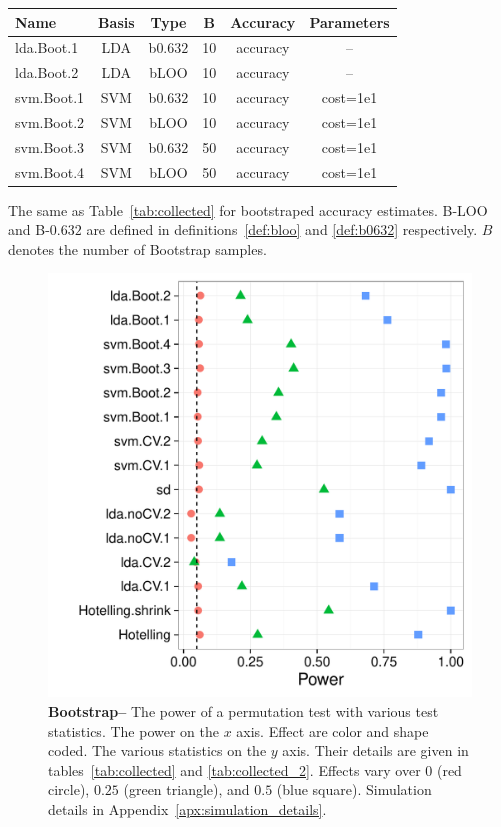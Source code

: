 \documentclass[12pt,a4paper]{article}
\theoremstyle{definition}
\begin{document}
\bigskip

\begin{tcolorbox}
\centering
\begin{tabular}{l|c|c|c|c|c}
Name & Basis & Type & B & Accuracy & Parameters\\ 
\hline
\hline
lda.Boot.1 & LDA & b$0.632$ 	& 10 & accuracy &  -- \\ 
lda.Boot.2 & LDA & bLOO 	& 10 & accuracy &  -- \\ 
svm.Boot.1 & SVM & b$0.632$ 	& 10 & accuracy & cost=1e1 \\ 
svm.Boot.2 & SVM & bLOO 	& 10 & accuracy & cost=1e1 \\ 
svm.Boot.3 & SVM & b$0.632$ 	& 50 & accuracy & cost=1e1 \\ 
svm.Boot.4 & SVM & bLOO 	& 50 & accuracy & cost=1e1 \\ 
\end{tabular} 
\captionsetup{type=table}
\caption{
The same as Table~\ref{tab:collected} for bootstraped accuracy estimates. 
B-LOO and B-$0.632$ are defined in definitions~\ref{def:bloo} and \ref{def:b0632} respectively.
$B$ denotes the number of Bootstrap samples. } %
\label{tab:collected_2}
\end{tcolorbox}


\begin{figure}[ht]
\centering
	  \includegraphics[width=0.7\linewidth]{"art/2016-08-09 20:09:20"}
	  \caption{
		  \textbf{Bootstrap--}
		  The power of a permutation test with various test statistics. 
		  The power on the $x$ axis. 
		  Effect are color and shape coded. 
		  The various statistics on the $y$ axis. 
		  Their details are given in tables~\ref{tab:collected} and \ref{tab:collected_2}. 
		  Effects vary over $0$ (red circle), $0.25$ (green triangle), and $0.5$ (blue square). 
		  Simulation details in Appendix~\ref{apx:simulation_details}.
		  } 
	\label{fig:bootstrap}
\end{figure}
\end{document}
